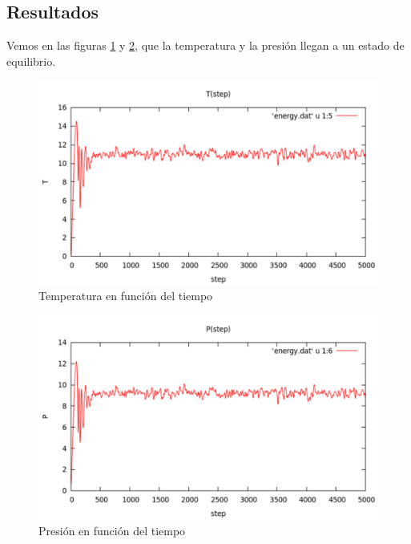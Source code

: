 \subsection{Resultados}
Vemos en las figuras \ref{fig:tempe} y \ref{fig:presion}, que la temperatura y la presión llegan a un estado de equilibrio.
\begin{figure}[h!]
\includegraphics[scale=0.50]{temperatura.pdf} 
\caption{Temperatura en función del tiempo} 
\label{fig:tempe}
\end{figure}\begin{figure}[h!]
\includegraphics[scale=0.50]{presion.pdf} 
\caption{Presión en función del tiempo} 
\label{fig:presion}
\end{figure}
